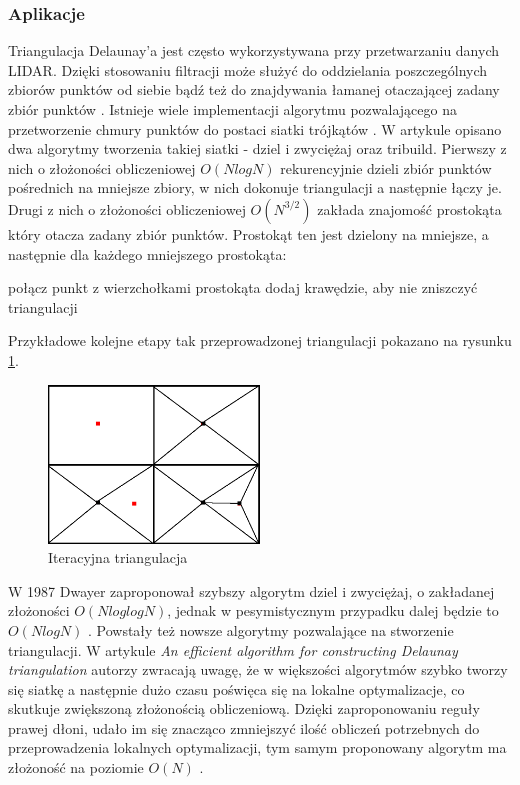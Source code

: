 \subsubsection{Aplikacje}
Triangulacja Delaunay'a jest często wykorzystywana przy przetwarzaniu danych LIDAR. Dzięki stosowaniu filtracji może służyć do oddzielania poszczególnych zbiorów punktów od siebie \cite{koziol2007} bądź też do znajdywania łamanej otaczającej zadany zbiór punktów \cite{website:HumanGeoBlog}. Istnieje wiele implementacji algorytmu pozwalającego na przetworzenie chmury punktów do postaci siatki trójkątów \cite{Lee1980,Dwyer1987,jiang2010}. W artykule \cite{Lee1980} opisano dwa algorytmy tworzenia takiej siatki - dziel i zwyciężaj oraz tribuild. Pierwszy z nich o złożoności obliczeniowej $O(N log N)$ rekurencyjnie dzieli zbiór punktów pośrednich na mniejsze zbiory, w nich dokonuje triangulacji a następnie łączy je. Drugi z nich o złożoności obliczeniowej $O(N^{3/2})$ zakłada znajomość prostokąta który otacza zadany zbiór punktów. Prostokąt ten jest dzielony na mniejsze, a następnie dla każdego mniejszego prostokąta:

\begin{algorithmic}
        \State połącz punkt z wierzchołkami prostokąta
    \Else
        \State dodaj krawędzie, aby nie zniszczyć triangulacji
    \EndIf
    \EndFor
\end{algorithmic}

Przykładowe kolejne etapy tak przeprowadzonej triangulacji pokazano na rysunku \ref{fig:iter_triangulacja}.

\begin{figure}[h!]
    \centering
    \includegraphics[width=0.5\textwidth]{img/iter_triangulacja.jpg}
    \caption{Iteracyjna triangulacja}
    \label{fig:iter_triangulacja}
\end{figure}

W 1987 Dwayer zaproponował szybszy algorytm dziel i zwyciężaj, o zakładanej złożoności $O(N log log N)$, jednak w pesymistycznym przypadku dalej będzie to $O(N log N)$  \cite{Dwyer1987}. Powstały też nowsze algorytmy pozwalające na stworzenie triangulacji. W artykule \textsl{An efficient algorithm for constructing Delaunay triangulation} autorzy zwracają uwagę, że w większości algorytmów szybko tworzy się siatkę a następnie dużo czasu poświęca się na lokalne optymalizacje, co skutkuje zwiększoną złożonością obliczeniową. Dzięki zaproponowaniu reguły prawej dłoni, udało im się znacząco zmniejszyć ilość obliczeń potrzebnych do przeprowadzenia lokalnych optymalizacji, tym samym proponowany algorytm ma złożoność na poziomie $O(N)$ \cite{jiang2010}.

